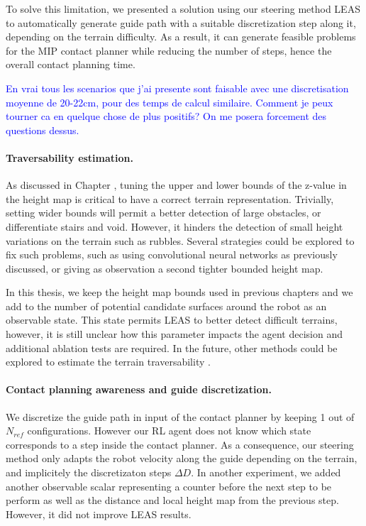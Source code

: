To solve this limitation, we presented a solution using our steering method LEAS to automatically generate guide path with a suitable discretization step along it, depending on the terrain difficulty.
As a result, it can generate feasible problems for the MIP contact planner while reducing the number of steps, hence the overall contact planning time.

\textcolor{blue}{En vrai tous les scenarios que j'ai presente sont faisable avec une discretisation moyenne de 20-22cm, pour des temps de calcul similaire. Comment je peux tourner ca en quelque chose de plus positifs? On me posera forcement des questions dessus.}


\paragraph{Traversability estimation.}
As discussed in Chapter \cite{sec:LEAS}, tuning the upper and lower bounds of the z-value in the height map is critical to have a correct terrain representation.
Trivially, setting wider bounds will permit a better detection of large obstacles, or differentiate stairs and void. However, it hinders the detection of small height variations on the terrain such as rubbles.
Several strategies could be explored to fix such problems, such as using convolutional neural networks as previously discussed, or giving as observation a second tighter bounded height map.

In this thesis, we keep the height map bounds used in previous chapters and we add to the number of potential candidate surfaces around the robot as an observable state.
This state permits LEAS to better detect difficult terrains, however, it is still unclear how this parameter impacts the agent decision and additional ablation tests are required.
In the future, other methods could be explored to estimate the terrain traversability \cite{lin_traversability_2018, brandao_multimode_2019}.

\paragraph{Contact planning awareness and guide discretization.}
We discretize the guide path in input of the contact planner by keeping 1 out of $N_{ref}$ configurations.
However our RL agent does not know which state corresponds to a step inside the contact planner.
As a consequence, our steering method only adapts the robot velocity along the guide depending on the terrain, and implicitely the discretizaton steps $\Delta D$.
In another experiment, we added another observable scalar representing a counter before the next step to be perform as well as the distance and local height map from the previous step. However, it did not improve LEAS results.

